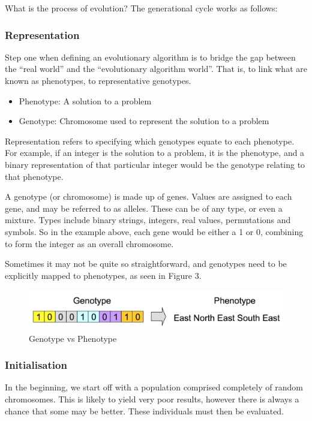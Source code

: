 \documentclass[12pt,a4paper]{article}
\begin{document}
What is the process of evolution? The generational cycle works as follows:

\subsubsection{Representation}
Step one when defining an evolutionary algorithm is to bridge the gap between the \enquote{real world} and the \enquote{evolutionary algorithm world}\citep{IntroductionToEvolutionaryComputing}. That is, to link what are known as phenotypes, to representative genotypes. 


\begin{itemize}
	\item Phenotype: A solution to a problem
	\item Genotype: Chromosome used to represent the solution to a problem
\end{itemize}

Representation refers to specifying which genotypes equate to each phenotype\citep{IntroductionToEvolutionaryComputing}. For example, if an integer is the solution to a problem, it is the phenotype, and a binary representation of that particular integer would be the genotype relating to that phenotype. 

A genotype (or chromosome) is made up of genes. Values are assigned to each gene, and may be referred to as alleles. These can be of any type, or even a mixture. Types include binary strings, integers, real values, permutations and symbols. So in the example above, each gene would be either a 1 or 0, combining to form the integer as an overall chromosome.

Sometimes it may not be quite so straightforward, and genotypes need to be explicitly mapped to phenotypes, as seen in Figure 3. 

\begin{figure}[h]
	\centering
	\includegraphics[width = \textwidth]{GenoToPheno.png}
	\caption{Genotype vs Phenotype}
\end{figure}


\subsubsection{Initialisation}
In the beginning, we start off with a population comprised completely of random chromosomes. This is likely to yield very poor results, however there is always a chance that some may be better. These individuals must then be evaluated.
\end{document}
